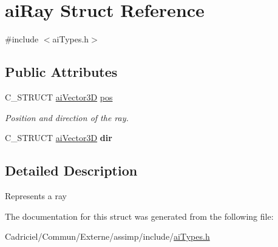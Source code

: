 \hypertarget{structai_ray}{\section{ai\-Ray Struct Reference}
\label{structai_ray}
}


{\ttfamily \#include $<$ai\-Types.\-h$>$}

\subsection*{Public Attributes}
\begin{DoxyCompactItemize}
\item 
\hypertarget{structai_ray_a312f663a7d2580b1b3beb52ffd4ab4c9}{C\-\_\-\-S\-T\-R\-U\-C\-T \hyperlink{structai_vector3_d}{ai\-Vector3\-D} \hyperlink{structai_ray_a312f663a7d2580b1b3beb52ffd4ab4c9}{pos}}\label{structai_ray_a312f663a7d2580b1b3beb52ffd4ab4c9}

\begin{DoxyCompactList}\small\item\em Position and direction of the ray. \end{DoxyCompactList}\item 
\hypertarget{structai_ray_a635d9120af2654716e5e7952d837282b}{C\-\_\-\-S\-T\-R\-U\-C\-T \hyperlink{structai_vector3_d}{ai\-Vector3\-D} {\bfseries dir}}\label{structai_ray_a635d9120af2654716e5e7952d837282b}

\end{DoxyCompactItemize}


\subsection{Detailed Description}
Represents a ray 

The documentation for this struct was generated from the following file\-:\begin{DoxyCompactItemize}
\item 
Cadriciel/\-Commun/\-Externe/assimp/include/\hyperlink{ai_types_8h}{ai\-Types.\-h}\end{DoxyCompactItemize}
